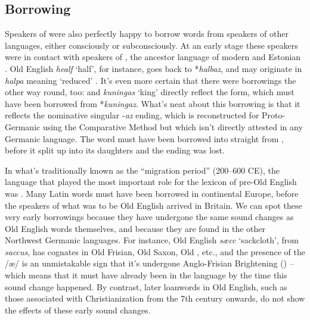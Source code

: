 \subsection{Borrowing}\label{prehistory-borrowing}
Speakers of  were also perfectly happy to borrow words from speakers of other languages, either consciously or subconsciously. At an early stage these speakers were in contact with speakers of , the ancestor language of modern  and Estonian \citep{Koivulehto2002}. Old English \emph{healf} `half', for instance, goes back to  *\emph{halbaz}, and may originate in  \emph{halpa} meaning `reduced' \citep[103--105]{Hyllested2014}. It's even more certain that there were borrowings the other way round, too:  and  \emph{kuningas} `king' directly reflect the  form, which must have been borrowed from  *\emph{kuningaz}. What's neat about this borrowing is that it reflects the nominative singular -\emph{az} ending, which is reconstructed for Proto-Germanic using the Comparative Method but which isn't directly attested in any Germanic language. The word must have been borrowed into  straight from , before it split up into its daughters and the ending was lost.

In what's traditionally known as the ``migration period'' (200--600 CE), the language that played the most important role for the lexicon of pre-Old English was . Many Latin words must have been borrowed in continental Europe, before the speakers of what was to be Old English arrived in Britain. We can spot these very early borrowings because they have undergone the same sound changes as Old English words themselves, and because they are found in the other Northwest Germanic languages. For instance, Old English \emph{sæcc} `sackcloth', from  \emph{saccus}, has cognates in Old Frisian, Old Saxon, Old , etc., and the presence of the /æ/ is an unmistakable sign that it's undergone Anglo-Frisian Brightening () -- which means that it must have already been in the language by the time this sound change happened. By contrast, later  loanwords in Old English, such as those associated with Christianization from the 7th century onwards, do not show the effects of these early sound changes.

